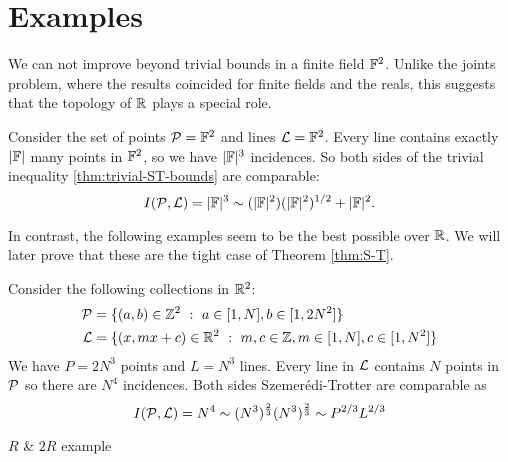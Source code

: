 \section{Examples}
We can not improve beyond trivial bounds in a finite field $\mathbb F^2$. Unlike the joints problem, where the results coincided for finite fields and the reals,
this suggests that the topology of $\mathbb R$ plays a special role. 
\begin{example}
Consider the set of points $\mathcal P=\mathbb F^2$ and lines 
$\mathcal L = \mathbb F^2$. Every line contains exactly $|\mathbb F|$ many points in $\mathbb F^2$, so we have $|\mathbb F|^3$ incidences. 
So both sides of the trivial inequality \ref{thm:trivial-ST-bounds} are comparable:
$$
I(\mathcal P,\mathcal L) = |\mathbb F|^3 \sim (|\mathbb F|^2)(|\mathbb F|^2)^{1/2} + |\mathbb F|^2.
$$
\end{example}
In contrast, the following examples seem to be the best possible over $\mathbb R$. We will later prove that these are the tight case of Theorem \ref{thm:S-T}.
\begin{example} Consider the following collections in $\mathbb R^2$:
    \begin{align*}
    \mathcal P &= \{ (a,b) \in \mathbb Z^2 \ : \ a\in [1,N], b \in [1,2N^2] \} \\
    \mathcal L &= \{ (x,mx+c) \in \mathbb R^2 \ : \ m,c\in \mathbb Z, m\in [1,N], c \in [1,N^2] \} \end{align*}
    We have $P= 2N^3$ points and $L = N^3$ lines. Every line in $\mathcal L$ contains $N$ points in $\mathcal P$ so there are
    $N^4$ incidences. Both sides Szemerédi-Trotter are comparable as 
    $$ I(\mathcal P,\mathcal L) = N^4 \sim (N^3)^{\frac{2}{3}} (N^3)^{\frac{2}{3}} \sim P^{2/3} L^{2/3}$$
\end{example}
\begin{example}
    $R$ \& $2R$ example
\end{example}



